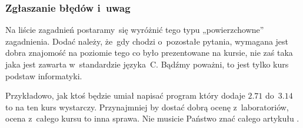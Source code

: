 \documentclass[10pt,t]{beamer}
\begin{document}
\begin{frame}
  \frametitle{Zgłaszanie błędów i~uwag}


  Na liście zagadnień postaramy~się wyróżnić tego typu „powierzchowne”
  zagadnienia. Dodać należy, że~gdy chodzi o~pozostałe pytania, wymagana
  jest dobra znajomość na \alert{poziomie tego co było prezentowane na
    kursie}, nie zaś taka jaka jest zawarta w~standardzie języka~C.
  Bądźmy poważni, to jest tylko kurs podstaw informatyki.

  Przykładowo, jak ktoś będzie umiał napisać program który dodaje $2.71$
  do~$3.14$ to na \alert{ten} kurs wystarczy. Przynajmniej by dostać dobrą
  ocenę z~laboratoriów, ocena z~\alert{całego} kursu to inna sprawa.
  Nie musicie Państwo znać całego artykułu
  .



\end{frame}
\end{document}
